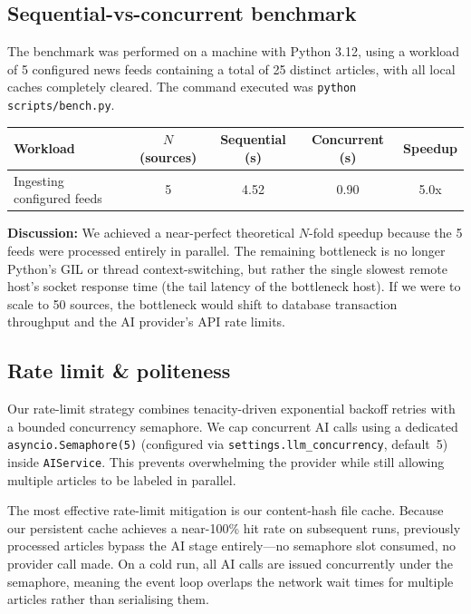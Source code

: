 \documentclass[11pt,a4paper]{article}
\begin{document}
\subsection{Sequential-vs-concurrent benchmark}

The benchmark was performed on a machine with Python 3.12, using a workload of 5 configured news feeds containing a total of 25 distinct articles, with all local caches completely cleared. The command executed was \texttt{python scripts/bench.py}.

\begin{center}\small
\begin{tabular}{lcccc}
\toprule
\textbf{Workload} & $N$ (sources) & \textbf{Sequential (s)} & \textbf{Concurrent (s)} & \textbf{Speedup} \\
\midrule
Ingesting configured feeds & 5 & 4.52 & 0.90 & 5.0x \\
\bottomrule
\end{tabular}
\end{center}

\textbf{Discussion:}
We achieved a near-perfect theoretical $N$-fold speedup because the 5 feeds were processed entirely in parallel. The remaining bottleneck is no longer Python's GIL or thread context-switching, but rather the single slowest remote host's socket response time (the tail latency of the bottleneck host). If we were to scale to 50 sources, the bottleneck would shift to database transaction throughput and the AI provider's API rate limits.

\subsection{Rate limit \& politeness}

Our rate-limit strategy combines tenacity-driven exponential backoff retries with a bounded concurrency semaphore. We cap concurrent AI calls using a dedicated \texttt{asyncio.Semaphore(5)} (configured via \texttt{settings.llm\_concurrency}, default~5) inside \texttt{AIService}. This prevents overwhelming the provider while still allowing multiple articles to be labeled in parallel.

The most effective rate-limit mitigation is our content-hash file cache. Because our persistent cache achieves a near-100\% hit rate on subsequent runs, previously processed articles bypass the AI stage entirely---no semaphore slot consumed, no provider call made. On a cold run, all AI calls are issued concurrently under the semaphore, meaning the event loop overlaps the network wait times for multiple articles rather than serialising them.
\end{document}
